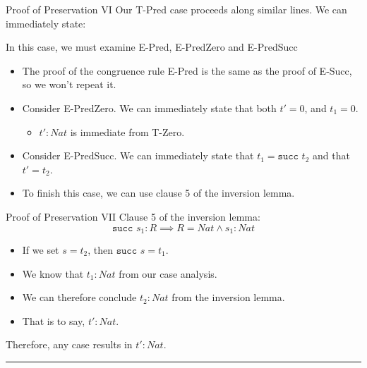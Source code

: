 \documentclass[11pt]{beamer}
\begin{document}
\begin{frame}[fragile=singleslide]{Proof of Preservation VI}
Our T-Pred case proceeds along similar lines.  We can immediately state: 
In this case, we must examine E-Pred, E-PredZero and E-PredSucc
\begin{itemize}
\item The proof of the congruence rule E-Pred is the same as the proof of E-Succ, so we won't repeat it.  
\item Consider E-PredZero.  We can immediately state that both $t' = 0$, and $t_1 = 0$.
\begin{itemize}
\item $t' : Nat$ is immediate from T-Zero.
\end{itemize}
\item Consider E-PredSucc.  We can immediately state that $t_1 = \texttt{succ } t_2$ and that $t' = t_2$.
\item To finish this case, we can use clause 5 of the inversion lemma.  
\end{itemize}
\end{frame}

\begin{frame}[fragile=singleslide]{Proof of Preservation VII}
Clause 5 of the inversion lemma:
\begin{equation}
\texttt{succ } s_1 : R \implies R = Nat \land s_1 : Nat
\end{equation}

\begin{itemize}
\item If we set $s = t_2$, then $\texttt{succ } s = t_1$.
\item We know that $t_1 : Nat$ from our case analysis. 
\item We can therefore conclude $t_2 : Nat$ from the inversion lemma.
\item That is to say, $t' : Nat$.
\end{itemize}
Therefore, any case results in $t' : Nat$.  
\hrule 
\vspace{0.5em}
\end{frame}
\end{document}
